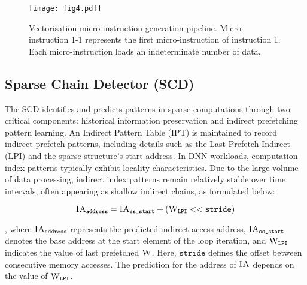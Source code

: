 \begin{figure}[t]
\vspace{-5pt}
\hspace{-20pt}
\texttt{[image: fig4.pdf]}
\vspace{-25pt}
\caption{Vectorisation micro-instruction generation pipeline. Micro-instruction 1-1 represents the first micro-instruction of instruction 1. %
Each micro-instruction loads an indeterminate number of data.}
\vspace{-15pt}
\label{fig:fig4}
\end{figure}


\subsection{Sparse Chain Detector (SCD)}
\vspace{-2pt}

The SCD identifies and predicts patterns in sparse computations through two critical components: historical information preservation and indirect prefetching pattern learning.
An Indirect Pattern Table (IPT) is maintained to record indirect prefetch patterns, including details such as the Last Prefetch Indirect (LPI) and the sparse structure's start address.
In DNN workloads, computation index patterns typically exhibit locality characteristics. Due to the large volume of data processing, indirect index patterns remain relatively stable over time intervals, often appearing as shallow indirect chains, as formulated below: %
\vspace{-5pt}
\begin{small}
$$
\ia_{\texttt{address}} = \ia_{\texttt{ss\_start}} + (\w_{\texttt{LPI}} << \texttt{stride}) 
\vspace{-5pt}
$$
\end{small}
\noindent
, where $\mbox{\sc IA}_{\texttt{address}}$ represents the predicted indirect access address, $\mbox{\sc IA}_{\texttt{ss\_start}}$ denotes the base address at the start element of the loop iteration, and $\mbox{\sc W}_{\texttt{LPI}}$ indicates the value of last prefetched $\mbox{\sc W}$. Here, $\texttt{stride}$ defines the offset between consecutive memory accesses. 
The prediction for the address of $\mbox{\sc IA}$ depends on the value of $\mbox{\sc W}_{\texttt{LPI}}$.

